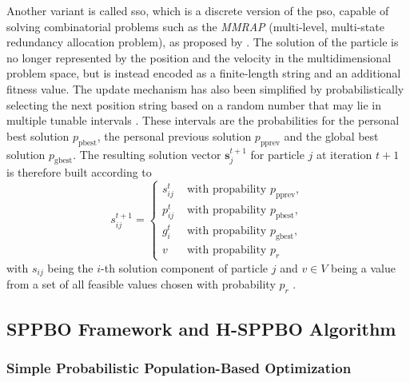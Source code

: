 Another variant is called \gls{sso}, which is a discrete version of the \gls{pso}, capable of solving combinatorial problems such as the \textit{MMRAP} (multi-level, multi-state redundancy allocation problem), as proposed by \citet{yeh2009two}. The solution of the particle is no longer represented by the position and the velocity in the multidimensional problem space, but is instead encoded as a finite-length string and an additional fitness value. The update mechanism has also been simplified by probabilistically selecting the next position string based on a random number that may lie in multiple tunable intervals \cite{yeh2012simplified}. These intervals are the probabilities for the personal best solution $p_{\text{pbest}}$, the personal previous solution $p_{\text{pprev}} $ and the global best solution $p_{\text{gbest}}$. The resulting solution vector $\mathbf{s}^{t+1}_j$ for particle $j$ at iteration $t+1$ is therefore built according to
\begin{equation}
	\label{eq:sso_rule}
	s_{ij}^{t+1} = \begin{cases}
		s^t_{ij} & \text{ with propability } p_{\text{pprev}}, \\
		p^t_{ij} & \text{ with propability } p_{\text{pbest}}, \\
		g^t_{i} &\text{ with propability } p_{\text{gbest}}, \\
		v & \text{ with propability } p_{r}
	\end{cases}
\end{equation}
with $s_{ij}$ being the $i$-th solution component of particle $j$ and $v \in V$ being a value from a set of all feasible values chosen with probability $p_r$ \cite{lin2015simple}. 


\subsection{SPPBO Framework and H-SPPBO Algorithm}

\subsubsection{Simple Probabilistic Population-Based Optimization}

